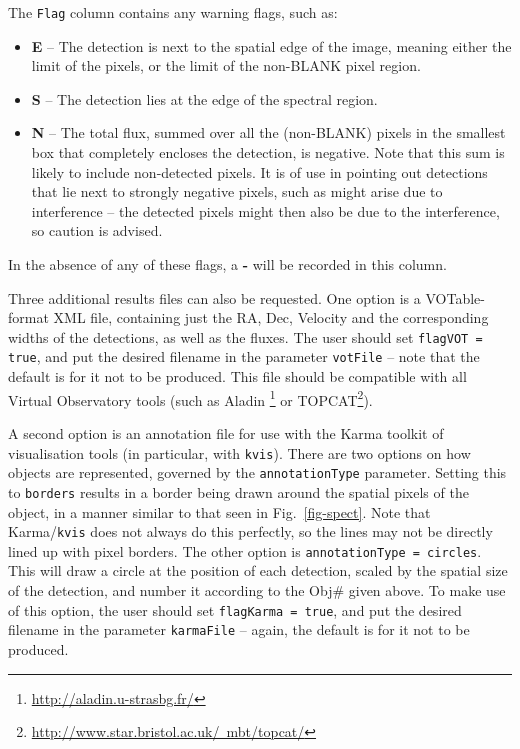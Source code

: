 The \texttt{Flag} column contains any warning flags, such as:
\begin{itemize}
\item \textbf{E} -- The detection is next to the spatial edge of the image,
meaning either the limit of the pixels, or the limit of the non-BLANK
pixel region.
\item \textbf{S} -- The detection lies at the edge of the spectral region. 
\item \textbf{N} -- The total flux, summed over all the (non-BLANK)
pixels in the smallest box that completely encloses the detection, is
negative. Note that this sum is likely to include non-detected
pixels. It is of use in pointing out detections that lie next to
strongly negative pixels, such as might arise due to interference --
the detected pixels might then also be due to the interference, so
caution is advised.
\end{itemize}
In the absence of any of these flags, a \textbf{-} will be recorded in
this column.


Three additional results files can also be requested. One option is a
VOTable-format XML file, containing just the RA, Dec, Velocity and the
corresponding widths of the detections, as well as the fluxes. The
user should set \texttt{flagVOT = true}, and put the desired filename
in the parameter \texttt{votFile} -- note that the default is for it
not to be produced. This file should be compatible with all Virtual
Observatory tools (such as Aladin%
\footnote{%
\href{http://aladin.u-strasbg.fr/}{http://aladin.u-strasbg.fr/}}
or TOPCAT\footnote{%
\href{http://www.star.bristol.ac.uk/~mbt/topcat/}%
{http://www.star.bristol.ac.uk/~mbt/topcat/}}). 

A second option is an annotation file for use with the Karma toolkit
of visualisation tools (in particular, with \texttt{kvis}). There are
two options on how objects are represented, governed by the
\texttt{annotationType} parameter. Setting this to \texttt{borders}
results in a border being drawn around the spatial pixels of the
object, in a manner similar to that seen in Fig.~\ref{fig-spect}. Note
that Karma/\texttt{kvis} does not always do this perfectly, so the
lines may not be directly lined up with pixel borders. The other
option is \texttt{annotationType = circles}. This will draw a circle
at the position of each detection, scaled by the spatial size of the
detection, and number it according to the Obj\# given above. To make
use of this option, the user should set \texttt{flagKarma = true}, and
put the desired filename in the parameter \texttt{karmaFile} -- again,
the default is for it not to be produced.

